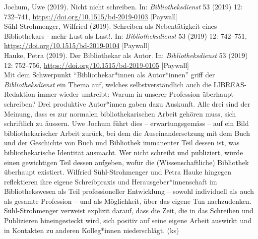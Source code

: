 \documentclass[a4paper,
fontsize=11pt,
oneside,
numbers=noperiodatend,
parskip=half-,
bibliography=totoc,
final
]{scrartcl}
\begin{document}
Jochum, Uwe (2019). Nicht nicht schreiben. In: \emph{Bibliotheksdienst}
53 (2019) 12: 732--741, \url{https://doi.org/10.1515/bd-2019-0103}
{[}Paywall{]}\\
Sühl-Strohmenger, Wilfried (2019). Schreiben als Nebentätigkeit eines
Bibliothekars - mehr Lust als Last!. In: \emph{Bibliotheksdienst} 53
(2019) 12: 742--751, \url{https://doi.org/10.1515/bd-2019-0104}
{[}Paywall{]}\\
Hauke, Petra (2019). Der Bibliothekar als Autor. In:
\emph{Bibliotheksdienst} 53 (2019) 12: 752--756,
\url{https://doi.org/10.1515/bd-2019-0105} {[}Paywall{]}\\
Mit dem Schwerpunkt ``Bibliothekar*innen als Autor*innen'' griff der
\emph{Bibliotheksdienst} ein Thema auf, welches selbstverständlich auch
die LIBREAS-Redaktion immer wieder umtreibt: Warum in unserer Profession
überhaupt schreiben? Drei produktive Autor*innen gaben dazu Auskunft.
Alle drei sind der Meinung, dass es zur normalen bibliothekarischen
Arbeit gehören muss, sich schriftlich zu äussern. Uwe Jochum führt dies
-- erwartungsgemäss -- auf ein Bild bibliothekarischer Arbeit zurück,
bei dem die Auseinandersetzung mit dem Buch und der Geschichte von Buch
und Bibliothek immanenter Teil dessen ist, was bibliothekarische
Identität ausmacht. Wer nicht schreibt und publiziert, würde einen
gewichtigen Teil dessen aufgeben, wofür die (Wissenschaftliche)
Bibliothek überhaupt existiert. Wilfried Sühl-Strohmenger und Petra
Hauke hingegen reflektieren ihre eigene Schreibpraxis und
Herausgeber*innenschaft im Bibliothekswesen als Teil professioneller
Entwicklung -- sowohl individuell als auch als gesamte Profession -- und
als Möglichkeit, über das eigene Tun nachzudenken. Sühl-Strohmenger
verweist explizit darauf, dass die Zeit, die in das Schreiben und
Publizieren hineingesteckt wird, sich positiv auf seine eigene Arbeit
auswirkt und in Kontakten zu anderen Kolleg*innen niederschlägt. (ks)
\end{document}
